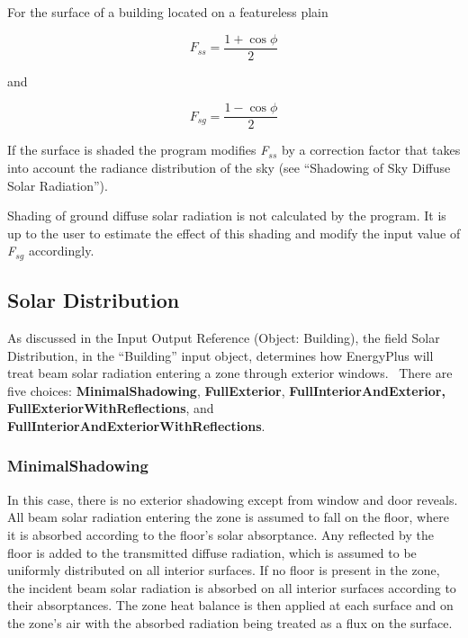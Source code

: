 For the surface of a building located on a featureless plain

\begin{equation}
{F_{ss}} = \frac{{1 + \cos \phi }}{2}
\end{equation}

and

\begin{equation}
{F_{sg}} = \frac{{1 - \cos \phi }}{2}
\end{equation}

If the surface is shaded the program modifies \emph{F\(_{ss}\)} by a correction factor that takes into account the radiance distribution of the sky (see ``Shadowing of Sky Diffuse Solar Radiation'').

Shading of ground diffuse solar radiation is not calculated by the program. It is up to the user to estimate the effect of this shading and modify the input value of \emph{F\(_{sg}\)} accordingly.

\subsection{Solar Distribution}\label{solar-distribution}

As discussed in the Input Output Reference (Object: Building), the field Solar Distribution, in the ``Building'' input object, determines how EnergyPlus will treat beam solar radiation entering a zone through exterior windows.~ There are five choices: \textbf{MinimalShadowing}, \textbf{FullExterior}, \textbf{FullInteriorAndExterior, FullExteriorWithReflections}, and \textbf{FullInteriorAndExteriorWithReflections}.

\subsubsection{MinimalShadowing}\label{minimalshadowing}

In this case, there is no exterior shadowing except from window and door reveals. All beam solar radiation entering the zone is assumed to fall on the floor, where it is absorbed according to the floor's solar absorptance. Any reflected by the floor is added to the transmitted diffuse radiation, which is assumed to be uniformly distributed on all interior surfaces. If no floor is present in the zone, the incident beam solar radiation is absorbed on all interior surfaces according to their absorptances. The zone heat balance is then applied at each surface and on the zone's air with the absorbed radiation being treated as a flux on the surface.

